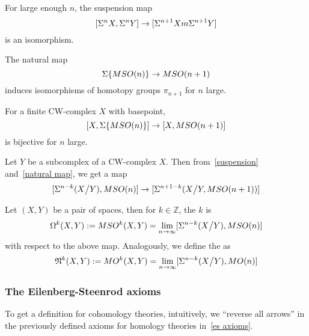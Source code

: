 \documentclass[a4paper,11pt]{article}
\begin{document}
\begin{theorem}\label{freudenthal}
    For large enough \(n\), the suspension map
    \[[\Sigma^nX,\Sigma^nY]\to[\Sigma^{n+1}Xm\Sigma^{n+1}Y]\]
    is an isomorphism.
\end{theorem}


\begin{lemma}\label{natural map}\cite{thom}
    The natural map
    \[\Sigma\{MSO(n)\}\to MSO(n+1)\]
    induces isomorphisms of homotopy groups \(\pi_{n+1}\) for \(n\) large.
\end{lemma}

\begin{corollary}
    For a finite CW-complex \(X\) with basepoint, \[[X,\Sigma\{MSO(n)\}]\to[X,MSO(n+1)]\] is bijective for \(n\) large.
\end{corollary}

\begin{lemma}
    Let \(Y\) be a subcomplex of a CW-complex \(X\). Then from\ \ref{suspension} and\ \ref{natural map}, we get a map
    \[[\Sigma^{n-k}(X\big/ Y),MSO(n)]\to[\Sigma^{n+1-k}(X\big/Y, MSO(n+1))]\]
\end{lemma}

\begin{definition}
    Let \((X,Y)\) be a pair of spaces, then for \(k\in\mathbb{Z}\), the \(k\) is
    \[\Omega^k(X,Y):=MSO^k(X,Y)=\lim_{n\to\infty}[\Sigma^{n-k}(X\big/Y),MSO(n)]\]
    with respect to the above map.
    Analogously, we define the  as
    \[\mathfrak{N}^k(X,Y):= MO^k(X,Y)=\lim_{n\to\infty}[\Sigma^{n-k}(X\big/ Y),MO(n)]\]
\end{definition}

\subsubsection{The Eilenberg-Steenrod axioms}
To get a definition for cohomology theories, intuitively, we \enquote{reverse all arrows} in the previously defined axioms for homology theories in\ \ref{es axioms}.
\end{document}
